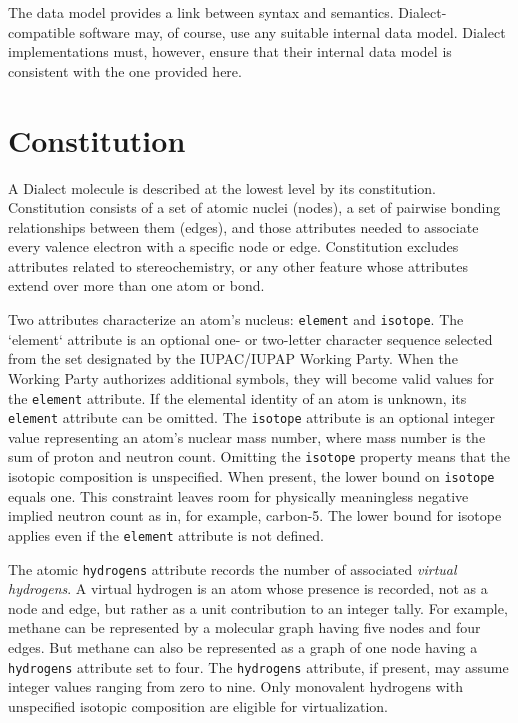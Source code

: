 \documentclass{article}
\def\ttt{\texttt}
\begin{document}
The data model provides a link between syntax and semantics. Dialect-compatible software may, of course, use any suitable internal data model. Dialect implementations must, however, ensure that their internal data model is consistent with the one provided here.

\section*{Constitution}

A Dialect molecule is described at the lowest level by its constitution. Constitution consists of a set of atomic nuclei (nodes), a set of pairwise bonding relationships between them (edges), and those attributes needed to associate every valence electron with a specific node or edge. Constitution excludes attributes related to stereochemistry, or any other feature whose attributes extend over more than one atom or bond.

Two attributes characterize an atom's nucleus: \ttt{element} and \ttt{isotope}. The `element` attribute is an optional one- or two-letter character sequence selected from the set designated by the IUPAC/IUPAP Working Party.\cite{iupac2016} When the Working Party authorizes additional symbols, they will become valid values for the \ttt{element} attribute. If the elemental identity of an atom is unknown, its \ttt{element} attribute can be omitted. The \ttt{isotope} attribute is an optional integer value representing an atom's nuclear mass number, where mass number is the sum of proton and neutron count. Omitting the \ttt{isotope} property means that the isotopic composition is unspecified. When present, the lower bound on \ttt{isotope} equals one. This constraint leaves room for physically meaningless negative implied neutron count as in, for example, carbon-5. The lower bound for isotope applies even if the \ttt{element} attribute is not defined.

The atomic \ttt{hydrogens} attribute records the number of associated \textit{virtual hydrogens}. A virtual hydrogen is an atom whose presence is recorded, not as a node and edge, but rather as a unit contribution to an integer tally. For example, methane can be represented by a molecular graph having five nodes and four edges. But methane can also be represented as a graph of one node having a \ttt{hydrogens} attribute set to four. The \ttt{hydrogens} attribute, if present, may assume integer values ranging from zero to nine. Only monovalent hydrogens with unspecified isotopic composition are eligible for virtualization.
\end{document}
